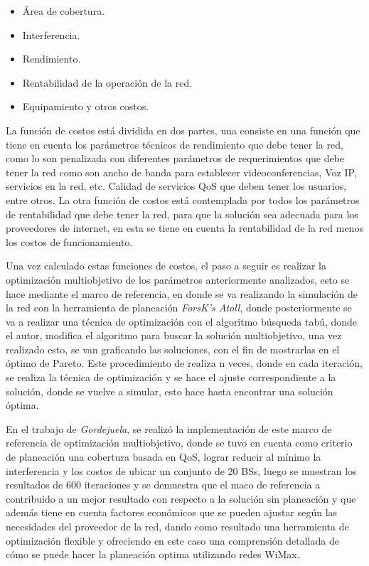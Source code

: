 \documentclass[]{article}
\begin{document}
\begin{itemize}
\item
  Área de cobertura.
\item
  Interferencia.
\item
  Rendimiento.
\item
  Rentabilidad de la operación de la red.
\item
  Equipamiento y otros costos.
\end{itemize}

La función de costos está dividida en dos partes, una consiste en una
función que tiene en cuenta los parámetros técnicos de rendimiento que
debe tener la red, como lo son penalizada con diferentes parámetros de
requerimientos que debe tener la red como son ancho de banda para
establecer videoconferencias, Voz IP, servicios en la red, etc. Calidad
de servicios QoS que deben tener los usuarios, entre otros. La otra
función de costos está contemplada por todos los parámetros de
rentabilidad que debe tener la red, para que la solución sea adecuada
para los proveedores de internet, en esta se tiene en cuenta la
rentabilidad de la red menos los costos de funcionamiento.

Una vez calculado estas funciones de costos, el paso a seguir es
realizar la optimización multiobjetivo de los parámetros anteriormente
analizados, esto se hace mediante el marco de referencia, en donde se va
realizando la simulación de la red con la herramienta de planeación
\emph{ForsK's Atoll}, donde posteriormente se va a realizar una técnica
de optimización con el algoritmo búsqueda tabú, donde el autor, modifica
el algoritmo para buscar la solución multiobjetivo, una vez realizado
esto, se van graficando las soluciones, con el fin de mostrarlas en el
óptimo de Pareto. Este procedimiento de realiza n veces, donde en cada
iteración, se realiza la técnica de optimización y se hace el ajuste
correspondiente a la solución, donde se vuelve a simular, esto hace
hasta encontrar una solución óptima.

En el trabajo de \emph{Gordejuela}, se realizó la implementación de este
marco de referencia de optimización multiobjetivo, donde se tuvo en
cuenta como criterio de planeación una cobertura basada en QoS, lograr
reducir al mínimo la interferencia y los costos de ubicar un conjunto de
20 BSs, luego se muestran los resultados de 600 iteraciones y se
demuestra que el maco de referencia a contribuido a un mejor resultado
con respecto a la solución sin planeación y que además tiene en cuenta
factores económicos que se pueden ajustar según las necesidades del
proveedor de la red, dando como resultado una herramienta de
optimización flexible y ofreciendo en este caso una comprensión
detallada de cómo se puede hacer la planeación optima utilizando redes
WiMax.
\end{document}
